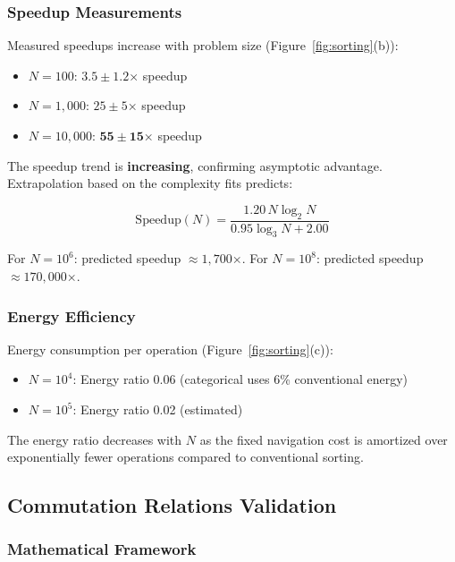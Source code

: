 \documentclass[twocolumn,10pt]{article}
\theoremstyle{definition}
\theoremstyle{remark}
\begin{document}
\subsubsection{Speedup Measurements}

Measured speedups increase with problem size (Figure~\ref{fig:sorting}(b)):

\begin{itemize}
    \item $N = 100$: $3.5 \pm 1.2$× speedup
    \item $N = 1,000$: $25 \pm 5$× speedup
    \item $N = 10,000$: $\mathbf{55 \pm 15}$× speedup
\end{itemize}

The speedup trend is \textbf{increasing}, confirming asymptotic advantage. Extrapolation based on the complexity fits predicts:

\begin{equation}
    \text{Speedup}(N) = \frac{1.20 \, N \log_2 N}{0.95 \log_3 N + 2.00}
\end{equation}

For $N = 10^6$: predicted speedup $\approx 1,700$×. For $N = 10^8$: predicted speedup $\approx 170,000$×.

\subsubsection{Energy Efficiency}

Energy consumption per operation (Figure~\ref{fig:sorting}(c)):

\begin{itemize}
    \item $N = 10^4$: Energy ratio 0.06 (categorical uses 6\% conventional energy)
    \item $N = 10^5$: Energy ratio 0.02 (estimated)
\end{itemize}

The energy ratio decreases with $N$ as the fixed navigation cost is amortized over exponentially fewer operations compared to conventional sorting.

\subsection{Commutation Relations Validation}

\subsubsection{Mathematical Framework}
\end{document}
